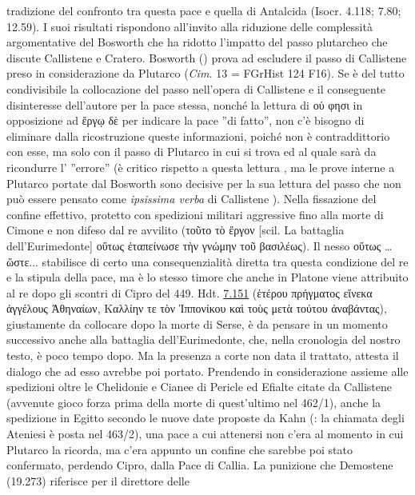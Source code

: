 {tradizione del confronto tra questa pace e quella di Antalcida (Isocr. 4.118; 7.80; 12.59).  I suoi risultati rispondono all'invito alla riduzione delle complessità argomentative del Bosworth che ha ridotto l'impatto del passo plutarcheo che 
discute  Callistene  e Cratero. Bosworth (\cite[1]{Bosworth1990}) prova ad escludere il passo di  Callistene  preso in considerazione da Plutarco (\emph{Cim.} 13 = FGrHist 124 F16). Se è del tutto condivisibile la collocazione del passo nell'opera di  Callistene  e il conseguente disinteresse dell'autore per la pace stessa, nonché la lettura di \textgreek{οὑ φησι} in opposizione ad \textgreek{ἔργῳ δὲ} per indicare la pace ''di fatto'', non c'è bisogno di eliminare dalla ricostruzione queste informazioni, poiché non è contraddittorio con esse, ma solo con il passo di Plutarco in cui si trova ed al quale sarà da ricondurre l' ''errore'' (è critico rispetto a questa lettura \cite[410 n.66]{Parmeggiani2011}, ma le prove interne a Plutarco portate dal Bosworth sono decisive per la sua lettura del passo che non può essere pensato come \emph{ipsissima verba} di  Callistene ). Nella fissazione del confine effettivo, protetto con spedizioni militari aggressive fino alla morte di  Cimone e non difeso dal re avvilito (\textgreek{τοῦτο τὸ ἔργον} [scil. La battaglia dell'Eurimedonte] \textgreek{οὕτως ἐταπείνωσε τὴν γνώμην τοῦ βασιλέως}). Il nesso \textgreek{οὕτως … ὥστε...} stabilisce di certo una consequenzialità diretta tra questa condizione del re e la stipula della pace, ma è lo stesso timore che anche in Platone viene attribuito al re dopo gli scontri di Cipro del 449. Hdt. \href{http://data.perseus.org/citations/urn:cts:greekLit:tlg0016.tlg001.perseus-grc1:7.151}{7.151} (\textgreek{ἑτέρου πρήγματος εἵνεκα ἀγγέλους Ἀθηναίων, Καλλίην τε τὸν Ἱππονίκου καὶ τοὺς μετὰ τούτου ἀναβάντας}), giustamente da collocare dopo la morte di Serse, è da pensare in un momento successivo anche alla battaglia dell'Eurimedonte, che, nella cronologia del nostro testo, è poco tempo dopo. Ma la presenza a corte non data il trattato, attesta il dialogo che ad esso avrebbe poi portato. Prendendo in considerazione assieme alle spedizioni oltre le Chelidonie e Cianee di Pericle  ed Efialte citate da  Callistene  (avvenute gioco forza prima della morte di quest'ultimo nel 462/1), anche la spedizione in Egitto secondo le nuove date proposte da Kahn (\cite*[440]{Kahn2008}: la chiamata degli Ateniesi è posta nel 463/2), una pace a cui attenersi non c'era al momento in cui Plutarco la ricorda, ma c'era appunto un confine che sarebbe poi stato confermato, perdendo Cipro, dalla Pace di Callia. La punizione che Demostene (19.273) riferisce per il direttore delle }

